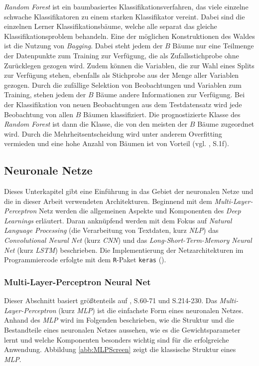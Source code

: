 \documentclass[a4paper,11pt]{article}
\begin{document}
\textit{Random Forest} ist ein baumbasiertes Klassifikationsverfahren, das viele einzelne schwache Klassifikatoren zu einem starken Klassifikator vereint. Dabei sind die einzelnen Lerner Klassifikationsbäume, welche alle separat das gleiche Klassifikationsproblem behandeln. Eine der möglichen Konstruktionen des Waldes ist die Nutzung von \textit{Bagging}. Dabei steht jedem der $B$ Bäume nur eine Teilmenge der Datenpunkte zum Training zur Verfügung, die als Zufallsstichprobe ohne Zurücklegen gezogen wird. Zudem können die Variablen, die zur Wahl eines Splits zur Verfügung stehen, ebenfalls als Stichprobe aus der Menge aller Variablen gezogen. Durch die zufällige Selektion von Beobachtungen und Variablen zum Training, stehen jedem der $B$ Bäume andere Informationen zur Verfügung. Bei der Klassifikation von neuen Beobachtungen aus dem Testdatensatz wird jede Beobachtung von allen $B$ Bäumen klassifiziert. Die prognostizierte Klasse des \textit{Random Forest} ist dann die Klasse, die von den meisten der $B$ Bäume zugeordnet wird. Durch die Mehrheitsentscheidung wird unter anderem Overfitting vermieden und eine hohe Anzahl von Bäumen ist von Vorteil (vgl. \cite{RF}, S.1f). 



\subsection{Neuronale Netze} \label{kap:neuralNets}

Dieses Unterkapitel gibt eine Einführung in das Gebiet der neuronalen Netze und die in dieser Arbeit verwendeten Architekturen. Beginnend mit dem \textit{Multi-Layer-Perceptron} Netz werden die allgemeinen Aspekte und Komponenten des \textit{Deep Learnings} erläutert. Daran anknüpfend werden mit dem Fokus auf \textit{Natural Language Processing} (die Verarbeitung von Textdaten, kurz \textit{NLP}) das \textit{Convolutional Neural Net} (kurz \textit{CNN}) und das \textit{Long-Short-Term-Memory Neural Net} (kurz \textit{LSTM}) beschrieben. Die Implementierung der Netzarchitekturen im Programmiercode erfolgte mit dem \texttt{R}-Paket \texttt{keras} (\cite{kerasR}).


\subsubsection{Multi-Layer-Perceptron Neural Net}

Dieser Abschnitt basiert größtenteils auf \cite{deepEssentials}, S.60-71 und S.214-230. %
Das \textit{Multi-Layer-Perceptron} (kurz \textit{MLP}) ist die einfachste Form eines neuronalen Netzes. Anhand des \textit{MLP} wird im Folgenden beschrieben, wie die Struktur und die Bestandteile eines neuronalen Netzes aussehen, wie es die Gewichtsparameter lernt und welche Komponenten besonders wichtig sind für die erfolgreiche Anwendung. Abbildung \ref{abb:MLPScreen} zeigt die klassische Struktur eines \textit{MLP}.
\end{document}
